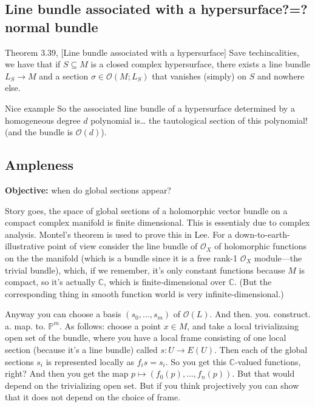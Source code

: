 \subsection{Line bundle associated with a hypersurface?=?normal bundle}

\begin{thing4}{Theorem 3.39, \cite{lec}}[Line bundle associated with a hypersurface]\label{thm:3.39, lec}\leavevmode
Save techincalities, we have that if \(S \subseteq M\) is a closed complex hypersurface, there exists a line bundle \(L_S \to M\) and a section \(\sigma \in \mathcal{O}(M;L_S)\) that vanishes (simply) on \(S\) and nowhere else.
\end{thing4}

\begin{thing8}{Nice example}\leavevmode
So the associated line bundle of a hypersurface determined by a homogeneous degree \(d\) polynomial is… the tautological section of this polynomial! (and the bundle is \(\mathcal{O}(d)\)).
\end{thing8}

\subsection{Ampleness}

\textbf{Objective:} when do global sections appear?

Story goes, the space of global sections of a holomorphic vector bundle on a compact complex manifold is finite dimensional. This is essentialy due to complex analysis. Montel's theorem is used to prove this in Lee. For a down-to-earth-illustrative point of view consider the line bundle of \(\mathcal{O}_X\) of holomorphic functions on the the manifold (which is a bundle since it is a free rank-1 \(\mathcal{O}_X\) module---the trivial bundle), which, if we remember, it's only constant functions because \(M\) is compact, so it's actually \(\mathbb{C}\), which is finite-dimensional over \(\mathbb{C}\). (But the corresponding thing in smooth function world is very infinite-dimensional.)

Anyway you can choose a basis \((s_0,\ldots,s_m)\) of \(\mathcal{O}(L)\). And then. you. construct. a. map. to. \(\mathbb{P}^m\). As follows: choose a point \(x \in M\), and take a local trivializaing open set of the bundle, where you have a local frame consisting of one local section (because it's a line bundle) called \(s: U \to E(U)\). Then each of the global sections \(s_i\) is represented locally as \(f_is=s_i\). So you get this \(\mathbb{C}\)-valued functions, right? And then you get the map \(p \mapsto (f_0(p),\ldots,f_n(p))\). But that would depend on the trivializing open set. But if you think projectively you can show that it does not depend on the choice of frame.

